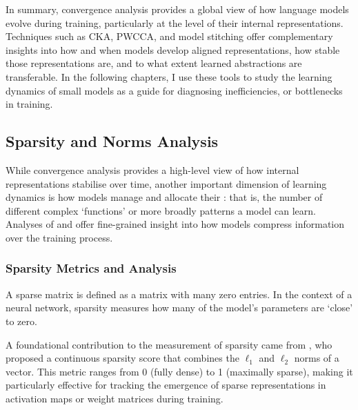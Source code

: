 In summary, convergence analysis provides a global view of how language models evolve during training, particularly at the level of their internal representations. Techniques such as CKA, PWCCA, and model stitching offer complementary insights into how and when models develop aligned representations, how stable those representations are, and to what extent learned abstractions are transferable. In the following chapters, I use these tools to study the learning dynamics of small models as a guide for diagnosing inefficiencies, or bottlenecks in training.

\subsection{Sparsity and Norms Analysis}

While convergence analysis provides a high-level view of how internal representations stabilise over time, another important dimension of learning dynamics is how models manage and allocate their : that is, the number of different complex `functions' or more broadly patterns a model can learn. Analyses of  and  offer fine-grained insight into how models compress information over the training process.


\subsubsection{Sparsity Metrics and Analysis}

A sparse matrix is defined as a matrix with many zero entries. In the context of a neural network, sparsity measures how many of the model's parameters are `close' to zero.

A foundational contribution to the measurement of sparsity came from \citet{hoyer2004sparsity}, who proposed a continuous sparsity score that combines the \( \ell_1 \) and \( \ell_2 \) norms of a vector. This  metric ranges from 0 (fully dense) to 1 (maximally sparse), making it particularly effective for tracking the emergence of sparse representations in activation maps or weight matrices during training.

